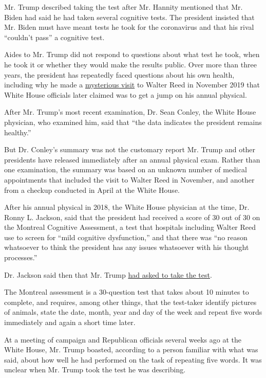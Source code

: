 Mr. Trump described taking the test after Mr. Hannity mentioned that Mr.
Biden had said he had taken several cognitive tests. The president
insisted that Mr. Biden must have meant tests he took for the
coronavirus and that his rival ``couldn't pass'' a cognitive test.

Aides to Mr. Trump did not respond to questions about what test he took,
when he took it or whether they would make the results public. Over more
than three years, the president has repeatedly faced questions about his
own health, including why he made a
\href{https://www.nytimes.com/2019/11/17/us/politics/-trump-annual-physical.html}{mysterious
visit} to Walter Reed in November 2019 that White House officials later
claimed was to get a jump on his annual physical.

After Mr. Trump's most recent examination, Dr. Sean Conley, the White
House physician, who examined him, said that ``the data indicates the
president remains healthy.''

But Dr. Conley's summary was not the customary report Mr. Trump and
other presidents have released immediately after an annual physical
exam. Rather than one examination, the summary was based on an unknown
number of medical appointments that included the visit to Walter Reed in
November, and another from a checkup conducted in April at the White
House.

After his annual physical in 2018, the White House physician at the
time, Dr. Ronny L. Jackson, said that the president had received a score
of 30 out of 30 on the Montreal Cognitive Assessment, a test that
hospitals including Walter Reed use to screen for ``mild cognitive
dysfunction,'' and that there was ``no reason whatsoever to think the
president has any issues whatsoever with his thought processes.''

Dr. Jackson said then that Mr. Trump
\href{https://www.nytimes.com/2018/01/16/us/politics/trump-health-exam-doctor-cognitive-test.html?action=click\&module=RelatedLinks\&pgtype=Article}{had
asked to take the test}.

The Montreal assessment is a 30-question test that takes about 10
minutes to complete, and requires, among other things, that the
test-taker identify pictures of animals, state the date, month, year and
day of the week and repeat five words immediately and again a short time
later.

At a meeting of campaign and Republican officials several weeks ago at
the White House, Mr. Trump boasted, according to a person familiar with
what was said, about how well he had performed on the task of repeating
five words. It was unclear when Mr. Trump took the test he was
describing.

